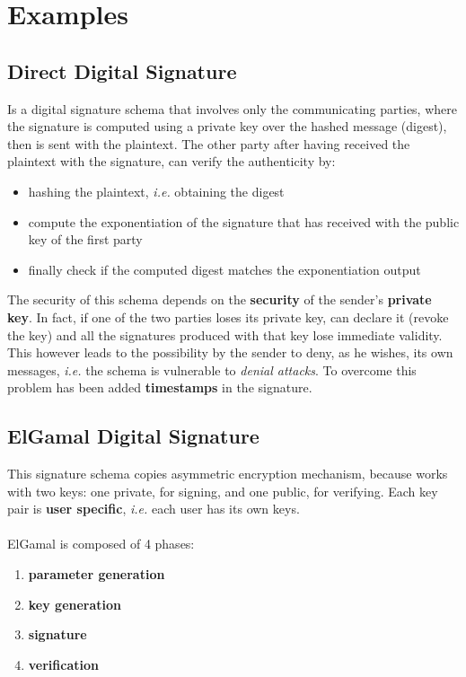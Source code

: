 \documentclass[oneside]{academica}
\begin{document}
\section{Examples}

\subsection{Direct Digital Signature}

Is a digital signature schema that involves only the communicating parties, where the signature is computed using a private key over the hashed message (digest), then is sent with the plaintext.
The other party after having received the plaintext with the signature, can verify the authenticity by:
\begin{itemize}
  \item hashing the plaintext, \textit{i.e.} obtaining the digest
  \item compute the exponentiation of the signature that has received with the public key of the first party
  \item finally check if the computed digest matches the exponentiation output
\end{itemize}

The security of this schema depends on the \textbf{security} of the sender's \textbf{private key}.
In fact, if one of the two parties loses its private key, can declare it (revoke the key) and all the signatures produced with that key lose immediate validity.
This however leads to the possibility by the sender to deny, as he wishes, its own messages, \textit{i.e.} the schema is vulnerable to \textit{denial attacks}.
To overcome this problem has been added \textbf{timestamps} in the signature.

\subsection{ElGamal Digital Signature}

This signature schema copies asymmetric encryption mechanism, because works with two keys: one private, for signing, and one public, for verifying.
Each key pair is \textbf{user specific}, \textit{i.e.} each user has its own keys.
\\\\
ElGamal is composed of 4 phases:
\begin{enumerate}
  \item \textbf{parameter generation}
  \item \textbf{key generation}
  \item \textbf{signature}
  \item \textbf{verification}
\end{enumerate}
\end{document}

